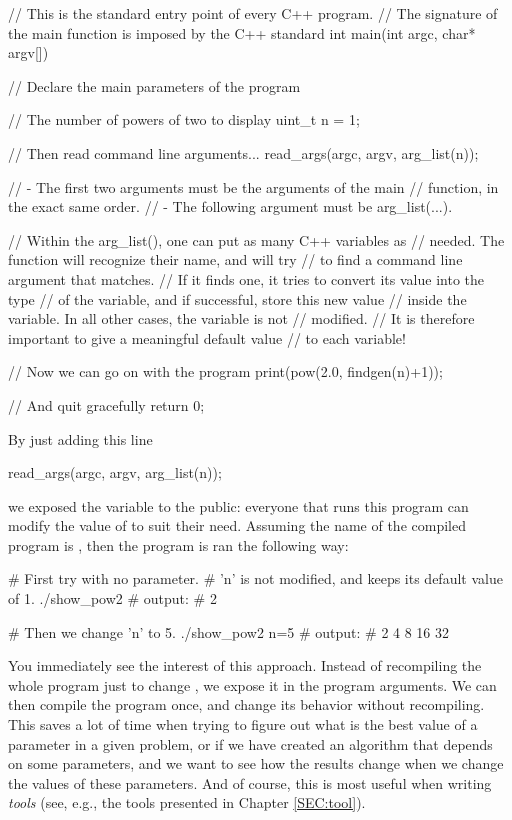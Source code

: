 \documentclass[12pt]{report}
\newenvironment{example}
{
    \begin{mdframed}[style=example,frametitle={Example}]
}
{
    \end{mdframed}
}
\begin{document}
\begin{example}
\begin{cppcode}
// This is the standard entry point of every C++ program.
// The signature of the main function is imposed by the C++ standard
int main(int argc, char* argv[]) {
    // Declare the main parameters of the program

    // The number of powers of two to display
    uint_t n = 1;

    // Then read command line arguments...
    read_args(argc, argv, arg_list(n));

    // - The first two arguments must be the arguments of the main
    //   function, in the exact same order.
    // - The following argument must be arg_list(...).

    // Within the arg_list(), one can put as many C++ variables as
    // needed. The function will recognize their name, and will try
    // to find a command line argument that matches.
    // If it finds one, it tries to convert its value into the type
    // of the variable, and if successful, store this new value
    // inside the variable. In all other cases, the variable is not
    // modified.
    // It is therefore important to give a meaningful default value
    // to each variable!

    // Now we can go on with the program
    print(pow(2.0, findgen(n)+1));

    // And quit gracefully
    return 0;
}
\end{cppcode}
\end{example}

By just adding this line
\begin{cppcode}
    read_args(argc, argv, arg_list(n));
\end{cppcode}
we exposed the variable  to the public: everyone that runs this program can modify the value of  to suit their need. Assuming the name of the compiled program is , then the program is ran the following way:

\begin{bashcode}
# First try with no parameter.
# 'n' is not modified, and keeps its default value of 1.
./show_pow2
# output:
# 2

# Then we change 'n' to 5.
./show_pow2 n=5
# output:
# 2 4 8 16 32
\end{bashcode}

You immediately see the interest of this approach. Instead of recompiling the whole program just to change , we expose it in the program arguments. We can then compile the program once, and change its behavior without recompiling. This saves a lot of time when trying to figure out what is the best value of a parameter in a given problem, or if we have created an algorithm that depends on some parameters, and we want to see how the results change when we change the values of these parameters. And of course, this is most useful when writing \emph{tools} (see, e.g., the tools presented in Chapter \ref{SEC:tool}).
\end{document}
